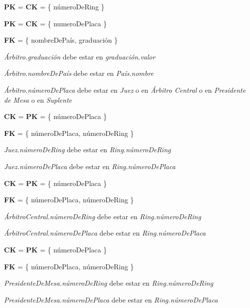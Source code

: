 
\textbf{PK} = \textbf{CK} = \{ númeroDeRing \}\\


\textbf{PK} = \textbf{CK} = \{ numeroDePlaca \}

\textbf{FK} = \{ nombreDePaís, graduación \}

\textit{Árbitro.graduación} debe estar en \textit{graduación.valor}

\textit{Árbitro.nombreDePaís} debe estar en \textit{País.nombre}

\textit{Árbitro.númeroDePlaca} debe estar en \textit{Juez} o en \textit{Árbitro Central} o en \textit{Presidente de Mesa} o en \textit{Suplente}\\

 
\textbf{CK} = \textbf{PK} = \{ númeroDePlaca \}
 
\textbf{FK} = \{ númeroDePlaca, númeroDeRing \}
 
\textit{Juez.númeroDeRing} debe estar en \textit{Ring.númeroDeRing}

\textit{Juez.númeroDePlaca} debe estar en \textit{Ring.númeroDePlaca}\\


\textbf{CK} = \textbf{PK} = \{ númeroDePlaca \}
 
\textbf{FK} = \{ númeroDePlaca, númeroDeRing \}
 
\textit{ÁrbitroCentral.númeroDeRing} debe estar en \textit{Ring.númeroDeRing}

\textit{ÁrbitroCentral.númeroDePlaca} debe estar en \textit{Ring.númeroDePlaca}\\


\textbf{CK} = \textbf{PK} = \{ númeroDePlaca \}
 
\textbf{FK} = \{ númeroDePlaca, númeroDeRing \}
 
\textit{PresidenteDeMesa.númeroDeRing} debe estar en \textit{Ring.númeroDeRing}

\textit{PresidenteDeMesa.númeroDePlaca} debe estar en \textit{Ring.númeroDePlaca}
